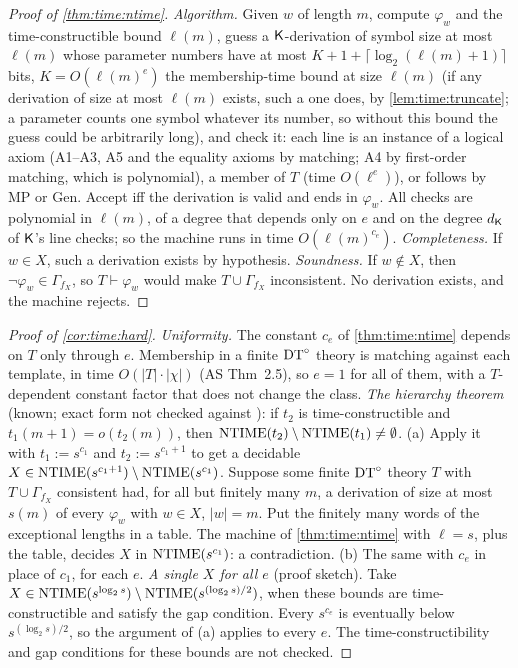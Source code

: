 \begin{proof}[Proof of \cref{thm:time:ntime}]
\emph{Algorithm.} Given $w$ of length $m$, compute $\varphi_w$ and the time-constructible bound $\ell(m)$, guess a $\mathsf{K}$-derivation of symbol size at most $\ell(m)$ whose parameter numbers have at most $K+1+\lceil\log_2(\ell(m)+1)\rceil$ bits, $K=O(\ell(m)^e)$ the membership-time bound at size $\ell(m)$ (if any derivation of size at most $\ell(m)$ exists, such a one does, by \cref{lem:time:truncate}; a parameter counts one symbol whatever its number, so without this bound the guess could be arbitrarily long), and check it: each line is an instance of a logical axiom (A1--A3, A5 and the equality axioms by matching; A4 by first-order matching, which is polynomial), a member of $T$ (time $O(\ell^e)$), or follows by MP or Gen. Accept iff the derivation is valid and ends in $\varphi_w$. All checks are polynomial in $\ell(m)$, of a degree that depends only on $e$ and on the degree $d_{\mathsf{K}}$ of $\mathsf{K}$'s line checks; so the machine runs in time $O(\ell(m)^{c_e})$.
\emph{Completeness.} If $w\in X$, such a derivation exists by hypothesis.
\emph{Soundness.} If $w\notin X$, then $\neg\varphi_w\in\Gamma_{f_X}$, so $T\vdash\varphi_w$ would make $T\cup\Gamma_{f_X}$ inconsistent. No derivation exists, and the machine rejects.
\end{proof}

\begin{proof}[Proof of \cref{cor:time:hard}]
\emph{Uniformity.} The constant $c_e$ of \cref{thm:time:ntime} depends on $T$ only through $e$. Membership in a finite $\mathrm{DT}^{\circ}$ theory is matching against each template, in time $O(|T|\cdot|\chi|)$ (AS Thm~2.5), so $e=1$ for all of them, with a $T$-dependent constant factor that does not change the class.
\emph{The hierarchy theorem} (known; exact form not checked against \citealp{cook1972hierarchy,seiferas1978separating,zak1983turing}): if $t_2$ is time-constructible and $t_1(m+1)=o(t_2(m))$, then $\mathrm{NTIME}(t_2)\setminus\mathrm{NTIME}(t_1)\ne\emptyset$.
(a) Apply it with $t_1:=s^{c_1}$ and $t_2:=s^{c_1+1}$ to get a decidable $X\in\mathrm{NTIME}(s^{c_1+1})\setminus\mathrm{NTIME}(s^{c_1})$. Suppose some finite $\mathrm{DT}^{\circ}$ theory $T$ with $T\cup\Gamma_{f_X}$ consistent had, for all but finitely many $m$, a derivation of size at most $s(m)$ of every $\varphi_w$ with $w\in X$, $|w|=m$. Put the finitely many words of the exceptional lengths in a table. The machine of \cref{thm:time:ntime} with $\ell=s$, plus the table, decides $X$ in $\mathrm{NTIME}(s^{c_1})$: a contradiction.
(b) The same with $c_e$ in place of $c_1$, for each $e$.
\emph{A single $X$ for all $e$} (proof sketch). Take $X\in\mathrm{NTIME}(s^{\log_2 s})\setminus\mathrm{NTIME}(s^{(\log_2 s)/2})$, when these bounds are time-constructible and satisfy the gap condition. Every $s^{c_e}$ is eventually below $s^{(\log_2 s)/2}$, so the argument of (a) applies to every $e$. The time-constructibility and gap conditions for these bounds are not checked.
\end{proof}

